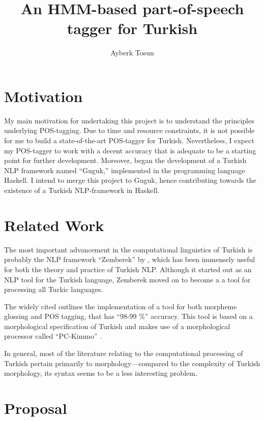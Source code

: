 \documentclass{article}
\title{\bf An HMM-based part-of-speech tagger for Turkish}
\author{Ayberk Tosun}
\date{}
\begin{document}
\maketitle

\section{Motivation}
\label{sec:motivation}
My main motivation for undertaking this project is to understand the
principles underlying POS-tagging. Due to time and resource constraints, it is
not possible for me to build a state-of-the-art POS-tagger for
Turkish. Nevertheless, I expect my POS-tagger
to work with a decent accuracy that is adequate to be a starting point for
further development. Moreover, \citet{Korkut2015} began the development of a
Turkish NLP framework named ``Guguk,'' implemented in the programming language Haskell. I intend
to merge this project to Guguk, hence contributing towards
the existence of a Turkish NLP-framework in Haskell.

\section{Related Work}
\label{sec:related_work}

The most important advancement in the computational linguistics of Turkish is
probably the NLP framework ``Zemberek'' by \citet{akin2007zemberek}, which has been
immensely useful for both the theory and practice of Turkish NLP. Although it started
out as an NLP tool for the Turkish language, Zemberek moved on to become a
a tool for processing all Turkic languages.

The widely cited \citet{oflazer1994tagging} outlines the implementation of a
tool for both morpheme glossing and POS tagging, that has ``98-99 \%'' accuracy. This
tool is based on a morphological specification of Turkish and makes use of a
morphological processor called ``PC-Kimmo'' \citep{antworth1991pc}.

In general, most of the literature relating to the computational processing of Turkish
pertain primarily to morphology---compared to the complexity of Turkish
morphology, its syntax seems to be a less interesting problem.
\section{Proposal}
\end{document}
